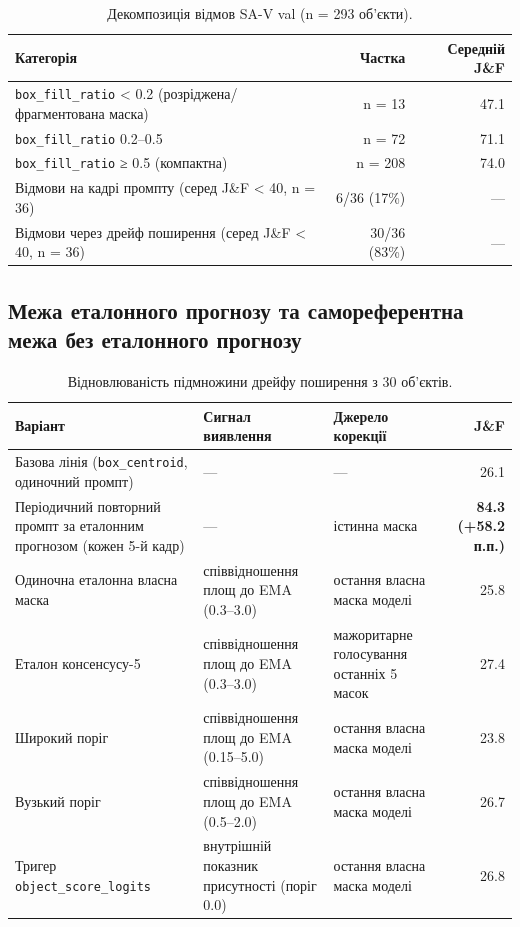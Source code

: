 \documentclass[11pt]{article}
\begin{document}
\begin{table}[!htbp]
\centering
\caption{Декомпозиція відмов SA-V val (n = 293 об'єкти).}
\label{tab:2}
\small
\begin{tabularx}{\textwidth}{@{}Lrr@{}}
\toprule
Категорія & Частка & Середній J\&F \\
\midrule
\texttt{box\_fill\_ratio} < 0.2 (розріджена/фрагментована маска) & n = 13 & 47.1 \\
\texttt{box\_fill\_ratio} 0.2--0.5 & n = 72 & 71.1 \\
\texttt{box\_fill\_ratio} ≥ 0.5 (компактна) & n = 208 & 74.0 \\
Відмови на кадрі промпту (серед J\&F < 40, n = 36) & 6/36 (17\%) & --- \\
Відмови через дрейф поширення (серед J\&F < 40, n = 36) & 30/36 (83\%) & --- \\
\bottomrule
\end{tabularx}
\end{table}

\subsection{Межа еталонного прогнозу та самореферентна межа без еталонного прогнозу}

\begin{table}[!htbp]
\centering
\caption{Відновлюваність підмножини дрейфу поширення з 30 об'єктів.}
\label{tab:3}
\small
\begin{tabularx}{\textwidth}{@{}LLLr@{}}
\toprule
Варіант & Сигнал виявлення & Джерело корекції & J\&F \\
\midrule
Базова лінія (\texttt{box\_centroid}, одиночний промпт) & --- & --- & 26.1 \\
Періодичний повторний промпт за еталонним прогнозом (кожен 5-й кадр) & --- & істинна маска & \textbf{84.3 (+58.2 п.п.)} \\
Одиночна еталонна власна маска & співвідношення площ до EMA (0.3--3.0) & остання власна маска моделі & 25.8 \\
Еталон консенсусу-5 & співвідношення площ до EMA (0.3--3.0) & мажоритарне голосування останніх 5 масок & 27.4 \\
Широкий поріг & співвідношення площ до EMA (0.15--5.0) & остання власна маска моделі & 23.8 \\
Вузький поріг & співвідношення площ до EMA (0.5--2.0) & остання власна маска моделі & 26.7 \\
Тригер \texttt{object\_score\_logits} & внутрішній показник присутності (поріг 0.0) & остання власна маска моделі & 26.8 \\
\bottomrule
\end{tabularx}
\end{table}
\end{document}

